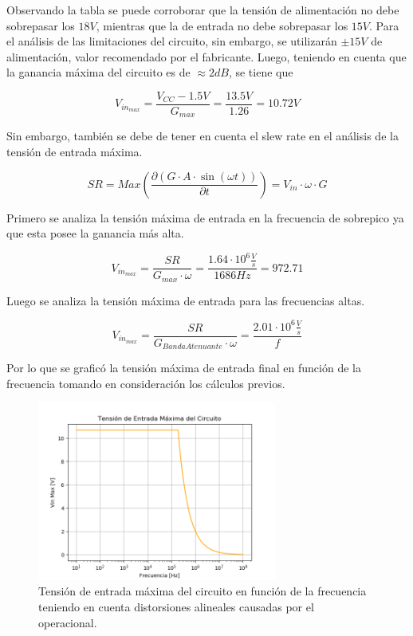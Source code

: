 Observando la tabla se puede corroborar que la tensión de alimentación no debe sobrepasar los $18V$, mientras que la de entrada no debe sobrepasar los $15V$. Para el análisis de las limitaciones del circuito, sin embargo, se utilizarán $\pm 15V$ de alimentación, valor recomendado por el fabricante.
Luego, teniendo en cuenta que la ganancia máxima del circuito es de $\approx 2dB$, se tiene que

\begin{equation}
	V_{in_{max}} = \frac{V_{CC} - 1.5V}{G_{max}} = \frac{13.5V}{1.26} = 10.72V
\end{equation}

Sin embargo, también se debe de tener en cuenta el slew rate en el análisis de la tensión de entrada máxima.

\begin{equation}
	SR= Max\left( \frac{\partial (G\cdot A\cdot \sin (\omega t))}{\partial t}\right) = V_{in} \cdot \omega \cdot G  
\end{equation}

Primero se analiza la tensión máxima de entrada en la frecuencia de sobrepico ya que esta posee la ganancia más alta.

\begin{equation}
	V_{in_{max}} = \frac{SR}{G_{max}\cdot \omega} = \frac{1.64\cdot 10^6\frac{V}{s}}{1686Hz} = 972.71
\end{equation}

Luego se analiza la tensión máxima de entrada para las frecuencias altas.

\begin{equation}
	V_{in_{max}} = \frac{SR}{G_{Banda Atenuante}\cdot \omega} = \frac{2.01\cdot 10^6\frac{V}{s}}{f}
\end{equation}

Por lo que se graficó la tensión máxima de entrada final en función de la frecuencia tomando en consideración los cálculos previos.

\begin{figure} [H]
	\centering
	\includegraphics[width=0.7\textwidth]{Imagenes1/vin_max.PNG}
	\caption{Tensión de entrada máxima del circuito en función de la frecuencia teniendo en cuenta distorsiones alineales causadas por el operacional.}
	\label{fig:vin_max}
\end{figure}

